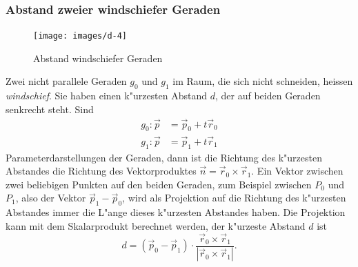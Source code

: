 \subsubsection{Abstand zweier windschiefer Geraden}
\begin{figure}
\begin{center}
\texttt{[image: images/d-4]}
\end{center}
\caption{Abstand windschiefer Geraden\label{windschief}}
\end{figure}
Zwei nicht parallele Geraden $g_0$ und $g_1$ im Raum,
die sich nicht schneiden, heissen
{\em windschief}.
Sie haben
einen k"urzesten Abstand $d$, der auf beiden Geraden senkrecht steht.
Sind
\begin{align*}
g_0:
\vec p&=\vec p_0+t\vec r_0\\
g_1:
\vec p&=\vec p_1+t\vec r_1
\end{align*}
Parameterdarstellungen der Geraden, dann ist die Richtung des k"urzesten
Abstandes die Richtung des Vektorproduktes $\vec n = \vec r_0\times\vec r_1$.
Ein Vektor zwischen zwei beliebigen Punkten auf den beiden Geraden,
zum Beispiel zwischen $P_0$ und $P_1$, also der Vektor $\vec p_1-\vec p_0$,
wird als Projektion auf die Richtung des k"urzesten Abstandes immer die
L"ange dieses k"urzesten Abstandes haben.
Die Projektion kann mit dem
Skalarprodukt berechnet werden, der k"urzeste Abstand $d$ ist
\[
d=(\vec p_0-\vec p_1)\cdot\frac{\vec r_0\times\vec r_1}{|\vec r_0\times\vec r_1|}.
\]


